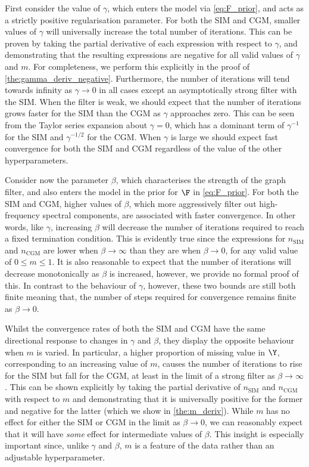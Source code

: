 First consider the value of $\gamma$, which enters the model via \cref{eq:F_prior}, and acts as a strictly positive regularisation parameter. For both the SIM and CGM, smaller values of $\gamma$ will universally increase the total number of iterations. This can be proven by taking the partial derivative of each expression with respect to $\gamma$, and demonstrating that the resulting expressions are negative for all valid values of $\gamma$ and $m$. For completeness, we perform this explicitly in the proof of \cref{the:gamma_deriv_negative}. Furthermore, the number of iterations will tend towards infinity as $\gamma \rightarrow 0$ in all cases except an asymptotically strong filter with the SIM. When the filter is weak, we should expect that the number of iterations grows faster for the SIM than the CGM as $\gamma$ approaches zero. This can be seen from the Taylor series expansion about $\gamma = 0$, which has a dominant term of $\gamma^{-1}$ for the SIM and $\gamma^{-1/2}$ for the CGM. When $\gamma$ is large we should expect fast convergence for both the SIM and CGM regardless of the value of the other hyperparameters. 

Consider now the parameter $\beta$, which characterises the strength of the graph filter, and also enters the model in the prior for $\F$ in \cref{eq:F_prior}. For both the SIM and CGM, higher values of $\beta$, which more aggressively filter out high-frequency spectral components, are associated with faster convergence. In other words, like $\gamma$, increasing $\beta$ will decrease the number of iterations required to reach a fixed termination condition. This is evidently true since the expressions for $n_\text{SIM}$ and $n_\text{CGM}$ are lower when $\beta \rightarrow \infty$ than they are when $\beta \rightarrow 0$, for any valid value of $0 \leq m \leq 1$. It is also reasonable to expect that the number of iterations will decrease monotonically as $\beta$ is increased, however, we provide no formal proof of this. In contrast to the behaviour of $\gamma$, however, these two bounds are still both finite meaning that, the number of steps required for convergence remains finite as $\beta \rightarrow 0$. 

Whilst the convergence rates of both the SIM and CGM have the same directional response to changes in $\gamma$ and $\beta$, they display the opposite behaviour when $m$ is varied. In particular, a higher proportion of missing value in $\Y$, corresponding to an increasing value of $m$, causes the number of iterations to rise for the SIM but fall for the CGM, at least in the limit of a strong filter as $\beta \rightarrow \infty$. This can be shown explicitly by taking the partial derivative of $n_\text{SIM}$ and $n_\text{CGM}$ with respect to $m$ and demonstrating that it is universally positive for the former and negative for the latter (which we show in \cref{the:m_deriv}). While $m$ has no effect for either the SIM or CGM in the limit as $\beta \rightarrow 0$, we can reasonably expect that it will have \textit{some} effect for intermediate values of $\beta$. This insight is especially important since, unlike $\gamma$ and $\beta$, $m$ is a feature of the data rather than an adjustable hyperparameter. 



